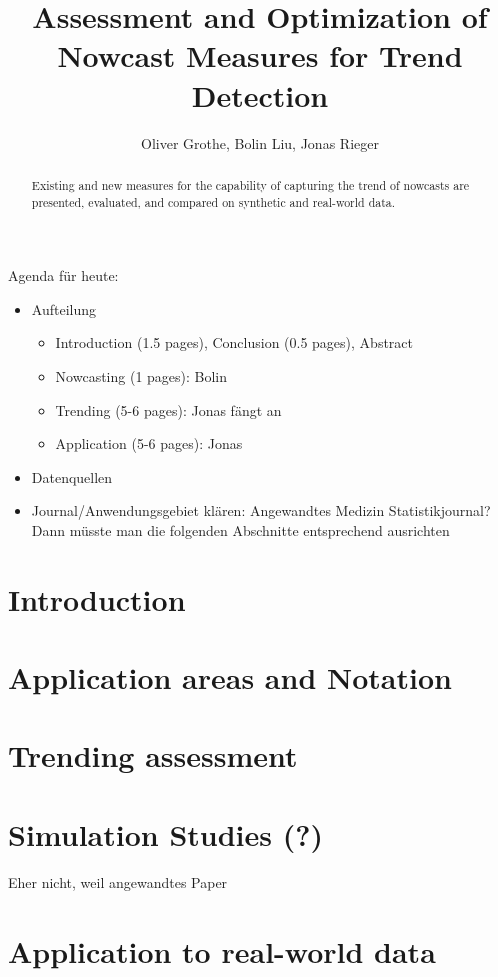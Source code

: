 \documentclass[oneside]{article}
\title{Assessment and Optimization of Nowcast Measures for Trend Detection}
\author{Oliver Grothe, Bolin Liu, Jonas Rieger}
\theoremstyle{plain}%
\theoremstyle{definition}
\begin{document}
\maketitle

\begin{abstract}
Existing and new measures for the capability of capturing the trend of nowcasts are presented, evaluated, and compared on synthetic and real-world data.
\end{abstract}

\listoftodos

Agenda für heute:
\begin{itemize}
    \item Aufteilung
    \begin{itemize}
        \item Introduction (1.5 pages), Conclusion (0.5 pages), Abstract
        \item Nowcasting (1 pages): Bolin
        \item Trending (5-6 pages): Jonas fängt an
        \item Application (5-6 pages): Jonas
    \end{itemize}
    \item Datenquellen
\end{itemize}

\begin{itemize}    
    \item Journal/Anwendungsgebiet klären: Angewandtes Medizin Statistikjournal? Dann müsste man die folgenden Abschnitte entsprechend ausrichten
\end{itemize}

\section{Introduction}\label{cap: intro}



\section{Application areas and Notation} \label{cap: notation}





\section{Trending assessment}\label{cap: trending}



\section{Simulation Studies (?)}

Eher nicht, weil angewandtes Paper

\section{Application to real-world data} \label{application}



\printbibliography
\end{document}
